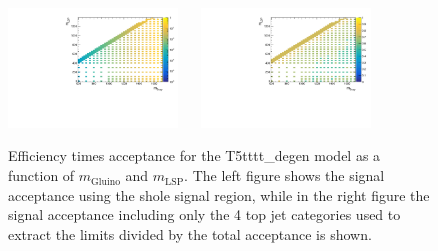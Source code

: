 \begin{figure}[h!]
  \begin{center}
    \includegraphics[width=0.4\textwidth]{figures/jetRanking/T5tttt_degen/eff/T5tttt_degen_merging_9_cats.pdf} ~~
    \includegraphics[width=0.4\textwidth]{figures/susyResults/T5tttt_degen_doubleRatioAcceptance.pdf} \\
    \caption{
      Efficiency times acceptance for the T5tttt\_degen model as a function of $m_{\mathrm{Gluino}}$ and $m_{\mathrm{LSP}}$.
      The left figure shows the signal acceptance using the shole signal region, 
      while in the right figure the signal acceptance including only the 4 top jet categories used to extract the limits divided by the total acceptance is shown.
    }
    \label{fig:sig-eff-T5tttt_degen}
  \end{center}
\end{figure}


